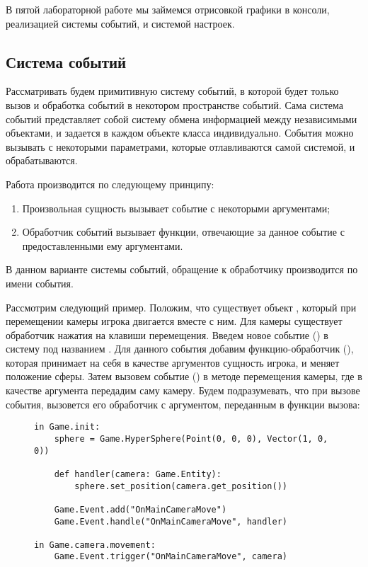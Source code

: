 В пятой лабораторной работе мы займемся отрисовкой графики в консоли, реализацией системы событий, и системой настроек.

\subsection{Система событий}
	
	Рассматривать будем примитивную систему событий, в которой будет только вызов и обработка событий в некотором пространстве событий. Сама система событий представляет собой систему обмена информацией между независимыми объектами, и задается в каждом объекте класса  индивидуально. События можно вызывать с некоторыми параметрами, которые отлавливаются самой системой, и обрабатываются.

	Работа производится по следующему принципу:
	\begin{enumerate}
		\item Произвольная сущность вызывает событие с некоторыми аргументами;
		\item Обработчик событий вызывает функции, отвечающие за данное событие с предоставленными ему аргументами.
	\end{enumerate}
	В данном варианте системы событий, обращение к обработчику производится по имени события.

	Рассмотрим следующий пример. Положим, что существует объект , который при перемещении камеры игрока  двигается вместе с ним. Для камеры существует обработчик нажатия на клавиши перемещения. Введем новое событие () в систему под названием . Для данного события добавим функцию-обработчик (), которая принимает на себя в качестве аргументов сущность игрока, и меняет положение сферы. Затем вызовем событие () в методе перемещения камеры, где в качестве аргумента передадим саму камеру. Будем подразумевать, что при вызове события, вызовется его обработчик с аргументом, переданным в функции вызова:

	\begin{figure}[H]
\begin{lstlisting}[caption=Пример кода реализации описанного алгоритма событий]
in Game.init:
	sphere = Game.HyperSphere(Point(0, 0, 0), Vector(1, 0, 0))

	def handler(camera: Game.Entity):
		sphere.set_position(camera.get_position())

	Game.Event.add("OnMainCameraMove")
	Game.Event.handle("OnMainCameraMove", handler)

in Game.camera.movement:
	Game.Event.trigger("OnMainCameraMove", camera)
\end{lstlisting}
	\end{figure}


